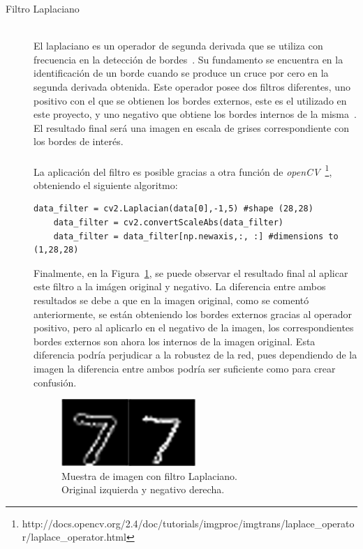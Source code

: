 \begin{description}
	\item[Filtro Laplaciano] \hfill 
	\vspace{10pt}
	\\
	El laplaciano es un operador de segunda derivada que se utiliza con frecuencia en la detección de bordes~\cite{laplacian}. Su fundamento se encuentra en la identificación de un borde cuando se produce un cruce por cero en la segunda derivada obtenida. Este operador posee dos filtros diferentes, uno positivo con el que se obtienen los bordes externos, este es el utilizado en este proyecto, y uno negativo que obtiene los bordes internos de la misma~\cite{laplacian2}. El resultado final será una imagen en escala de grises correspondiente con los bordes de interés.\\
	\vspace{-10pt}
	\\
	La aplicación del filtro es posible gracias a otra función de \textit{openCV}~\footnote{http://docs.opencv.org/2.4/doc/tutorials/imgproc/imgtrans/laplace\_operator/laplace\_operator.html}, obteniendo el siguiente algoritmo:
	\vspace{10pt}
	\begin{lstlisting}[frame=single]
	data_filter = cv2.Laplacian(data[0],-1,5) #shape (28,28)
	data_filter = cv2.convertScaleAbs(data_filter)
	data_filter = data_filter[np.newaxis,:, :] #dimensions to (1,28,28)
	\end{lstlisting}
	Finalmente, en la Figura~\ref{fig.laplacian}, se puede observar el resultado final al aplicar este filtro a la imágen original y negativo. La diferencia entre ambos resultados se debe a que en la imagen original, como se comentó anteriormente, se están obteniendo los bordes externos gracias al operador positivo, pero al aplicarlo en el negativo de la imagen, los correspondientes bordes externos son ahora los internos de la imagen original. Esta diferencia podría perjudicar a la robustez de la red, pues dependiendo de la imagen la diferencia entre ambos podría ser suficiente como para crear confusión.
	
	\begin{figure}[H]
		\begin{center}
			\includegraphics[width=0.5\textwidth]{figures/laplacian}
			\caption{Muestra de imagen con filtro Laplaciano.\\
				 Original izquierda y negativo derecha.}
			\label{fig.laplacian}
		\end{center}
	\end{figure}
	

\end{description}
